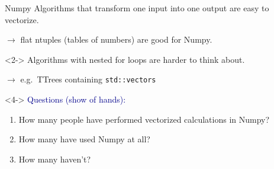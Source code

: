 \documentclass[aspectratio=169]{beamer}
\begin{document}
\begin{frame}{Numpy}
\vspace{0.5 cm}
Algorithms that transform one input into one output are easy to vectorize.

\vspace{0.15 cm}
\mbox{\hspace{0.5 cm}}$\longrightarrow$ flat ntuples (tables of numbers) are good for Numpy.

\vspace{0.25 cm}
\begin{uncoverenv}<2->
Algorithms with nested for loops are harder to think about.

\vspace{0.15 cm}
\mbox{\hspace{0.5 cm}}$\longrightarrow$ e.g.\ TTrees containing {\tt\small std::vectors}
\end{uncoverenv}

\vspace{0.25 cm}
\begin{center}
\begin{minipage}{0.85\linewidth}
\end{minipage}
\end{center}

\vspace{0.25 cm}
\begin{uncoverenv}<4->
\small
\textcolor{darkblue}{Questions (show of hands):}
\vspace{-0.2 cm}
\begin{enumerate}\setlength{\itemsep}{-0.1 cm}
\item How many people have performed vectorized calculations in Numpy?
\item How many have used Numpy at all?
\item How many haven't?
\end{enumerate}
\end{uncoverenv}
\end{frame}
\end{document}
